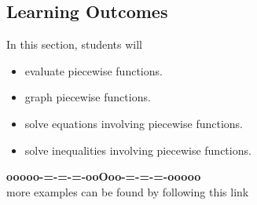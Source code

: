 \documentclass{ximera}
\begin{document}
\subsection*{Learning Outcomes}



\begin{sectionOutcomes}
In this section, students will 

\begin{itemize}
\item evaluate piecewise functions.
\item graph piecewise functions.
\item solve equations involving piecewise functions.
\item solve inequalities involving piecewise functions.
\end{itemize}
\end{sectionOutcomes}


















\begin{center}
\textbf{\textcolor{green!50!black}{ooooo-=-=-=-ooOoo-=-=-=-ooooo}} \\

more examples can be found by following this link\\ 

\end{center}
\end{document}
